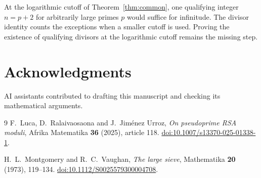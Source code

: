\documentclass[11pt]{article}
\begin{document}
At the logarithmic cutoff of Theorem~\ref{thm:common}, one qualifying
integer \(n=p+2\) for arbitrarily large primes \(p\) would suffice
for infinitude. The divisor identity counts the exceptions when a
smaller cutoff is used. Proving the existence of qualifying divisors
at the logarithmic cutoff remains the missing step.

\section*{Acknowledgments}
AI assistants contributed to drafting this manuscript and checking
its mathematical arguments.

\begin{thebibliography}{9}
F.~Luca, D.~Ralaivaosaona and J.~Jim\'enez Urroz,
\emph{On pseudoprime RSA moduli}, Afrika Matematika
\textbf{36} (2025), article 118.
\href{https://doi.org/10.1007/s13370-025-01338-1}{doi:10.1007/s13370-025-01338-1}.

H.~L.~Montgomery and R.~C.~Vaughan,
\emph{The large sieve}, Mathematika \textbf{20} (1973), 119--134.
\href{https://doi.org/10.1112/S0025579300004708}{doi:10.1112/S0025579300004708}.
\end{thebibliography}
\end{document}
